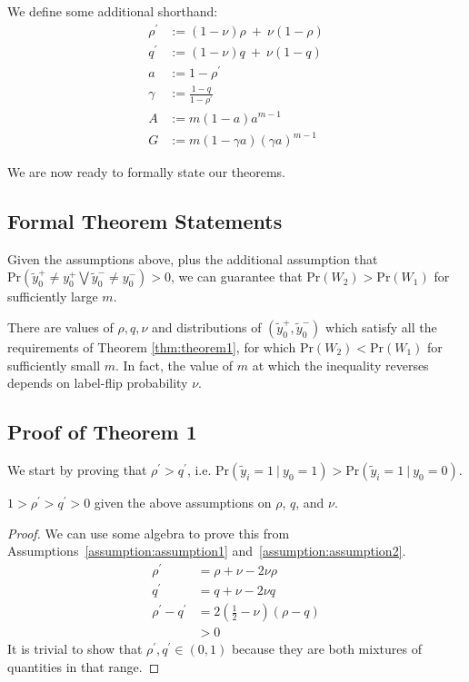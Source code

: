 We define some additional shorthand:
\begin{align}
\rho^{\prime} &:= (1 - \nu) \rho\ +\ \nu (1 - \rho)\\
q^{\prime} &:= (1 - \nu) q\ +\ \nu (1 - q)\\
a &:= 1 - \rho^{\prime}\\
\gamma &:= \frac{1 - q}{1 - \rho^{\prime}}\\
A &:= m (1 - a) a^{m-1}\\
G &:= m (1 - \gamma a) (\gamma a)^{m-1}
\end{align}

We are now ready to formally state our theorems.

\subsection{Formal Theorem Statements}

\begin{theorem}
\label{thm:theorem1}
Given the assumptions above, plus the additional assumption that $\textrm{Pr}(\tilde{y}_0^{+} \neq y_0^{+} \bigvee \tilde{y}_0^{-} \neq y_0^{-}) > 0$, we can guarantee that $\textrm{Pr}(W_2) > \textrm{Pr}(W_1)$ for sufficiently large $m$.
\end{theorem}

\begin{theorem}
\label{thm:theorem2}
There are values of $\rho, q, \nu$ and distributions of $(\tilde{y}_0^{+}, \tilde{y}_0^{-})$ which satisfy all the requirements of Theorem \ref{thm:theorem1}, for which $\textrm{Pr}(W_2) < \textrm{Pr}(W_1)$ for sufficiently small $m$. In fact, the value of $m$ at which the inequality reverses depends on label-flip probability $\nu$.
\end{theorem}

\subsection{Proof of Theorem 1}
\label{sec:theorem1_proof}

We start by proving that $\rho^{\prime} > q^{\prime}$, i.e. $\textrm{Pr}(\tilde{y}_i = 1\ |\ y_0 = 1) > \textrm{Pr}(\tilde{y}_i = 1\ |\ y_0 = 0)$.

\begin{lemma}
\label{lemma:lemma1}
$1 > \rho^{\prime} > q^{\prime} > 0$ given the above assumptions on $\rho$, $q$, and $\nu$.
\end{lemma}

\begin{proof}
We can use some algebra to prove this from Assumptions~\ref{assumption:assumption1} and~\ref{assumption:assumption2}.
\begin{align}
\rho^{\prime} &= \rho + \nu - 2 \nu \rho\\
q^{\prime} &= q + \nu - 2 \nu q\\
\rho^{\prime} - q^{\prime} &= 2 (\frac{1}{2} - \nu) (\rho - q)\\
&> 0
\end{align}
It is trivial to show that $\rho^{\prime}, q^{\prime} \in (0,1)$ because they are both mixtures of quantities in that range.
\end{proof}

